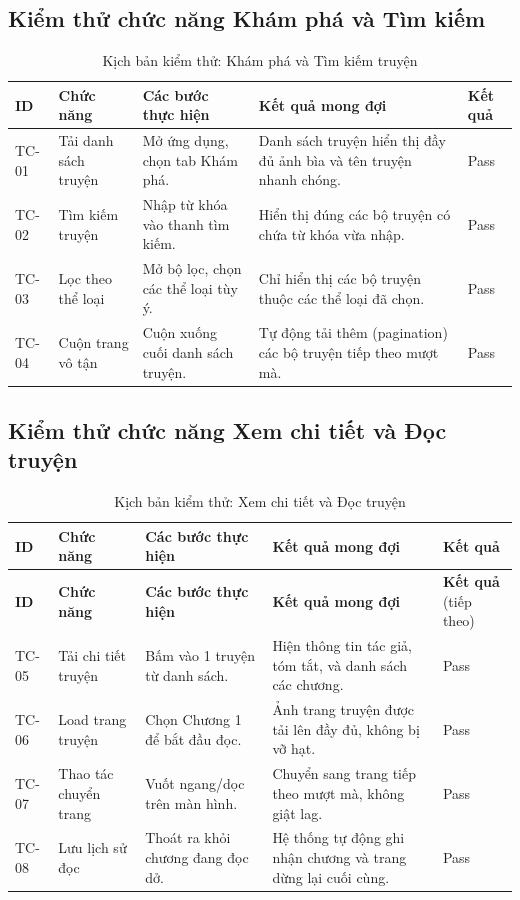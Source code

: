 \subsection{Kiểm thử chức năng Khám phá và Tìm kiếm}
\begin{table}[H]
    \centering
    \caption{Kịch bản kiểm thử: Khám phá và Tìm kiếm truyện}
    \label{tab:test_discover}
    \begin{tabular}{|p{1.2cm}|p{3.2cm}|p{4.2cm}|p{3.5cm}|p{1.4cm}|}
    \hline
    \textbf{ID} & \textbf{Chức năng} & \textbf{Các bước thực hiện} & \textbf{Kết quả mong đợi} & \textbf{Kết quả} \\ \hline
    TC-01 & Tải danh sách truyện & Mở ứng dụng, chọn tab Khám phá. & Danh sách truyện hiển thị đầy đủ ảnh bìa và tên truyện nhanh chóng. & Pass \\ \hline
    TC-02 & Tìm kiếm truyện & Nhập từ khóa vào thanh tìm kiếm. & Hiển thị đúng các bộ truyện có chứa từ khóa vừa nhập. & Pass \\ \hline
    TC-03 & Lọc theo thể loại & Mở bộ lọc, chọn các thể loại tùy ý. & Chỉ hiển thị các bộ truyện thuộc các thể loại đã chọn. & Pass \\ \hline
    TC-04 & Cuộn trang vô tận & Cuộn xuống cuối danh sách truyện. & Tự động tải thêm (pagination) các bộ truyện tiếp theo mượt mà. & Pass \\ \hline
    \end{tabular}
\end{table}

\subsection{Kiểm thử chức năng Xem chi tiết và Đọc truyện}
\begin{longtable}{|p{1.2cm}|p{3.2cm}|p{4.2cm}|p{3.5cm}|p{1.4cm}|}
    \caption{Kịch bản kiểm thử: Xem chi tiết và Đọc truyện} \label{tab:test_read} \\
    \hline
    \textbf{ID} & \textbf{Chức năng} & \textbf{Các bước thực hiện} & \textbf{Kết quả mong đợi} & \textbf{Kết quả} \\ \hline
    \endfirsthead %

    \hline
    \textbf{ID} & \textbf{Chức năng} & \textbf{Các bước thực hiện} & \textbf{Kết quả mong đợi} & \textbf{Kết quả} (tiếp theo) \\ \hline
    \endhead %

    TC-05 & Tải chi tiết truyện & Bấm vào 1 truyện từ danh sách. & Hiện thông tin tác giả, tóm tắt, và danh sách các chương. & Pass \\ \hline
    TC-06 & Load trang truyện & Chọn Chương 1 để bắt đầu đọc. & Ảnh trang truyện được tải lên đầy đủ, không bị vỡ hạt. & Pass \\ \hline
    TC-07 & Thao tác chuyển trang & Vuốt ngang/dọc trên màn hình. & Chuyển sang trang tiếp theo mượt mà, không giật lag. & Pass \\ \hline
    TC-08 & Lưu lịch sử đọc & Thoát ra khỏi chương đang đọc dở. & Hệ thống tự động ghi nhận chương và trang dừng lại cuối cùng. & Pass \\ \hline
\end{longtable}

